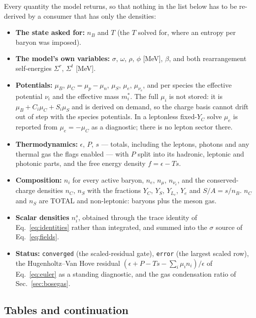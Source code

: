 \documentclass[aps,prc,onecolumn,superscriptaddress,nofootinbib,10pt]{revtex4-2}
\newcommand{\nB}{n_B}
\newcommand{\nC}{n_C}
\newcommand{\nS}{n_S}
\newcommand{\muB}{\mu_B}
\newcommand{\muC}{\mu_C}
\newcommand{\muS}{\mu_S}
\newcommand{\munue}{\mu_{\nu_e}}
\newcommand{\Sigmar}{\Sigma^{r}}
\newcommand{\Sigmat}{\Sigma^{t}}
\newcommand{\meff}[1]{m^{*}_{#1}}
\begin{document}
Every quantity the model returns, so that nothing in the list below has to be
re-derived by a consumer that has only the densities:

\begin{itemize}
\item \textbf{The state asked for:} $\nB$ and $T$ (the $T$ solved for, where an
      entropy per baryon was imposed).
\item \textbf{The model's own variables:} $\sigma$, $\omega$, $\rho$, $\phi$
      [MeV], $\beta$, and both rearrangement self-energies $\Sigmar$, $\Sigmat$
      [MeV].
\item \textbf{Potentials:} $\muB$, $\muC = \mu_p - \mu_n$, $\muS$, $\mu_e$,
      $\munue$, and per species the effective potential $\nu_i$ and the
      effective mass $\meff{i}$. The full $\mu_i$ is not stored: it is
      $\muB + C_i\muC + S_i\muS$ and is derived on demand, so the charge basis
      cannot drift out of step with the species potentials. In a leptonless
      fixed-$Y_C$ solve $\mu_e$ is reported from $\mu_e = -\muC$ as a
      diagnostic; there is no lepton sector there.
\item \textbf{Thermodynamics:} $\epsilon$, $P$, $s$ --- totals, including the
      leptons, photons and any thermal gas the flags enabled --- with $P$ split
      into its hadronic, leptonic and photonic parts, and the free energy
      density $f = \epsilon - Ts$.
\item \textbf{Composition:} $n_i$ for every active baryon, $n_e$, $n_\mu$,
      $n_{\nu_e}$, and the conserved-charge densities $\nC$, $\nS$ with the
      fractions $Y_C$, $Y_S$, $Y_{L_e}$, $Y_e$ and $S/A = s/\nB$. $\nC$ and
      $\nS$ are TOTAL and non-leptonic: baryons plus the meson gas.
\item \textbf{Scalar densities} $n^s_i$, obtained through the trace identity
      of Eq.~\eqref{eq:identities} rather than integrated, and summed into the
      $\sigma$ source of Eq.~\eqref{eq:fields}.
\item \textbf{Status:} \texttt{converged} (the scaled-residual gate),
      \texttt{error} (the largest scaled row), the Hugenholtz--Van Hove
      residual $(\epsilon + P - Ts - \sum_i\mu_i n_i)/\epsilon$ of
      Eq.~\eqref{eq:euler} as a standing diagnostic, and the gas condensation
      ratio of Sec.~\ref{sec:bosegas}.
\end{itemize}

\subsection{Tables and continuation}
\end{document}
